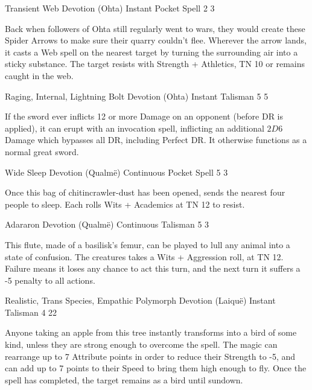 \begin{multicols}{2}
	{Transient Web}%
	{Devotion (Ohta)}%
	{Instant}%
	{Pocket Spell}%
	{2}%
	{3}
\label{spiderarrows}%

Back when followers of Ohta still regularly went to wars, they would create these Spider Arrows to make sure their quarry couldn't flee.
Wherever the arrow lands, it casts a Web spell on the nearest target by turning the surrounding air into a sticky substance.
The target resists with Strength + Athletics, TN 10 or remains caught in the web.

	{Raging, Internal, Lightning Bolt}%
	{Devotion (Ohta)}%
	{Instant}%
	{Talisman}%
	{5}%
	{5}%
\label{godslayer}

If the sword ever inflicts 12 or more Damage on an opponent (before DR is applied), it can erupt with an invocation spell, inflicting an additional $2D6$ Damage which bypasses all DR, including Perfect DR.
It otherwise functions as a normal great sword.

	{Wide Sleep}%
	{Devotion (Qualm\"e)}%
	{Continuous}%
	{Pocket Spell}%
	{5}%
	{3}%

Once this bag of chitincrawler-dust has been opened, sends the nearest four people to sleep.
Each rolls Wits + Academics at TN 12 to resist.

	{Adararon}%
	{Devotion (Qualm\"e)}%
	{Continuous}%
	{Talisman}%
	{5}%
	{3}%

This flute, made of a basilisk's femur, can be played to lull any animal into a state of confusion.
The creatures takes a Wits + Aggression roll, at TN 12.
Failure means it loses any chance to act this turn, and the next turn it suffers a -5 penalty to all actions.

	{Realistic, Trans Species, Empathic Polymorph}%
	{Devotion (Laiqu\"{e})}%
	{Instant}%
	{Talisman}%
	{4}%
	{22}%

Anyone taking an apple from this tree instantly transforms into a bird of some kind, unless they are strong enough to overcome the spell.  The magic can rearrange up to 7 Attribute points in order to reduce their Strength to -5, and can add up to 7 points to their Speed to bring them high enough to fly.  Once the spell has completed, the target remains as a bird until sundown.


\end{multicols}
